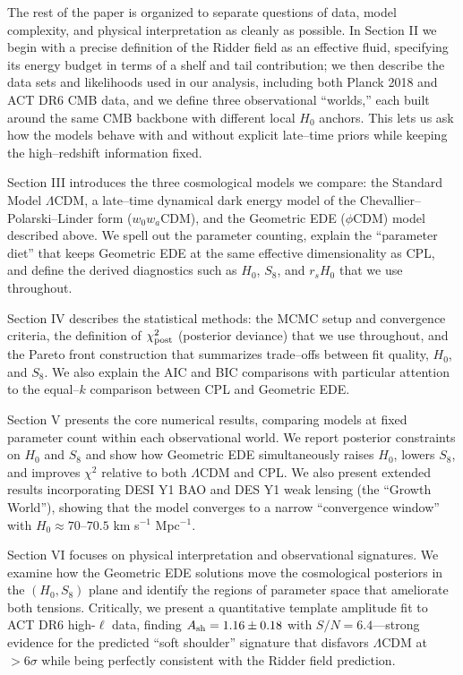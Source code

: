 \documentclass[a4paper,11pt]{article}
\begin{document}
The rest of the paper is organized to separate questions of data, model complexity, and physical interpretation as cleanly as possible. In Section II we begin with a precise definition of the Ridder field as an effective fluid, specifying its energy budget in terms of a shelf and tail contribution; we then describe the data sets and likelihoods used in our analysis, including both Planck 2018 and ACT DR6 CMB data, and we define three observational ``worlds,'' each built around the same CMB backbone with different local $H_0$ anchors. This lets us ask how the models behave with and without explicit late--time priors while keeping the high--redshift information fixed.

Section III introduces the three cosmological models we compare: the Standard Model $\Lambda$CDM, a late--time dynamical dark energy model of the Chevallier--Polarski--Linder form ($w_0 w_a$CDM), and the Geometric EDE ($\phi$CDM) model described above. We spell out the parameter counting, explain the ``parameter diet'' that keeps Geometric EDE at the same effective dimensionality as CPL, and define the derived diagnostics such as $H_0$, $S_8$, and $r_s H_0$ that we use throughout.

Section IV describes the statistical methods: the MCMC setup and convergence criteria, the definition of $\chi^2_{\rm post}$ (posterior deviance) that we use throughout, and the Pareto front construction that summarizes trade--offs between fit quality, $H_0$, and $S_8$. We also explain the AIC and BIC comparisons with particular attention to the equal--$k$ comparison between CPL and Geometric EDE.

Section V presents the core numerical results, comparing models at fixed parameter count within each observational world. We report posterior constraints on $H_0$ and $S_8$ and show how Geometric EDE simultaneously raises $H_0$, lowers $S_8$, and improves $\chi^2$ relative to both $\Lambda$CDM and CPL. We also present extended results incorporating DESI Y1 BAO and DES Y1 weak lensing (the ``Growth World''), showing that the model converges to a narrow ``convergence window'' with $H_0 \approx 70$--$70.5$ km s$^{-1}$ Mpc$^{-1}$.

Section VI focuses on physical interpretation and observational signatures. We examine how the Geometric EDE solutions move the cosmological posteriors in the $(H_0, S_8)$ plane and identify the regions of parameter space that ameliorate both tensions. Critically, we present a quantitative template amplitude fit to ACT DR6 high-$\ell$ data, finding $A_{\rm sh} = 1.16 \pm 0.18$ with $S/N = 6.4$---strong evidence for the predicted ``soft shoulder'' signature that disfavors $\Lambda$CDM at $>6\sigma$ while being perfectly consistent with the Ridder field prediction.
\end{document}
